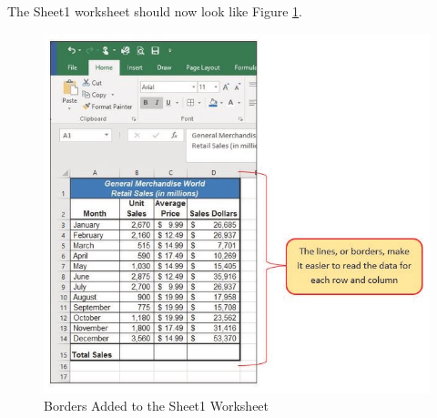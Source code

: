 The Sheet1 worksheet should now look like Figure \ref{01:fig44}.

\begin{figure}[H]
	\centering
	\includegraphics[width=\maxwidth{.95\linewidth}]{gfx/ch01_fig44}
	\caption{Borders Added to the Sheet1 Worksheet}
	\label{01:fig44}
\end{figure}

